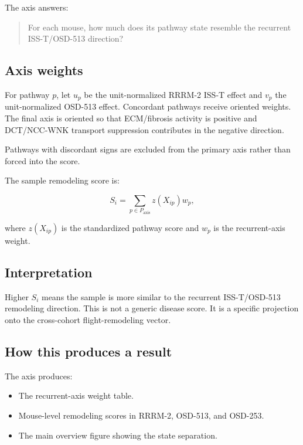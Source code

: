 \documentclass[11pt]{article}
\begin{document}
The axis answers:

\begin{quote}
For each mouse, how much does its pathway state resemble the recurrent ISS-T/OSD-513 direction?
\end{quote}

\subsection{Axis weights}

For pathway $p$, let $u_p$ be the unit-normalized RRRM-2 ISS-T effect and $v_p$ the unit-normalized OSD-513 effect. Concordant pathways receive oriented weights. The final axis is oriented so that ECM/fibrosis activity is positive and DCT/NCC-WNK transport suppression contributes in the negative direction.

Pathways with discordant signs are excluded from the primary axis rather than forced into the score.

The sample remodeling score is:

\begin{equation}
S_i=\sum_{p\in P_{\mathrm{axis}}} z(X_{ip})w_p,
\end{equation}

where $z(X_{ip})$ is the standardized pathway score and $w_p$ is the recurrent-axis weight.

\subsection{Interpretation}

Higher $S_i$ means the sample is more similar to the recurrent ISS-T/OSD-513 remodeling direction. This is not a generic disease score. It is a specific projection onto the cross-cohort flight-remodeling vector.

\subsection{How this produces a result}

The axis produces:

\begin{itemize}
  \item The recurrent-axis weight table.
  \item Mouse-level remodeling scores in RRRM-2, OSD-513, and OSD-253.
  \item The main overview figure showing the state separation.
\end{itemize}
\end{document}
